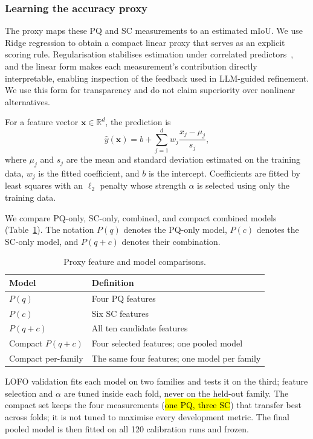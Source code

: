 \documentclass[a4paper,fleqn]{cas-dc}
\begin{document}
{\subsubsection{Learning the accuracy proxy}
\label{sec:ridge-proxy}

The proxy maps these PQ and SC measurements to an estimated mIoU. We use Ridge regression to obtain a compact linear proxy that serves as an explicit scoring rule. Regularisation stabilises estimation under correlated predictors~\cite{hoerl1970ridge,pedregosa2011sklearn}, and the linear form makes each measurement's contribution directly interpretable, enabling inspection of the feedback used in LLM-guided refinement. We use this form for transparency and do not claim superiority over nonlinear alternatives.

For a feature vector $\mathbf{x}\in\mathbb{R}^{d}$, the prediction is
\begin{equation}
\hat{y}(\mathbf{x})
=
b+\sum_{j=1}^{d}
w_j\frac{x_j-\mu_j}{s_j},
\label{eq:ridge-proxy}
\end{equation}
where $\mu_j$ and $s_j$ are the mean and standard deviation estimated on the training data, $w_j$ is the fitted coefficient, and $b$ is the intercept. Coefficients are fitted by least squares with an $\ell_2$ penalty whose strength $\alpha$ is selected using only the training data.

We compare PQ-only, SC-only, combined, and compact combined models (Table~\ref{tab:proxy-ablation}). The notation $P(q)$ denotes the PQ-only model, $P(c)$ denotes the SC-only model, and $P(q{+}c)$ denotes their combination.

\begin{table}[ht]
\caption{Proxy feature and model comparisons.}
\label{tab:proxy-ablation}
\centering
\begin{tabular}{p{} p{}}
\toprule
Model & Definition \\
\midrule
$P(q)$ & Four PQ features \\
$P(c)$ & Six SC features \\
$P(q{+}c)$ & All ten candidate features \\
Compact $P(q{+}c)$ & Four selected features; one pooled model \\
Compact per-family & The same four features; one model per family \\
\bottomrule
\end{tabular}
\end{table}

LOFO validation fits each model on two families and tests it on the third; feature selection and $\alpha$ are tuned inside each fold, never on the held-out family. The compact set keeps the four measurements (\hl{one PQ, three SC}) that transfer best across folds; it is not tuned to maximise every development metric. The final pooled model is then fitted on all 120 calibration runs and frozen.

}
\end{document}
